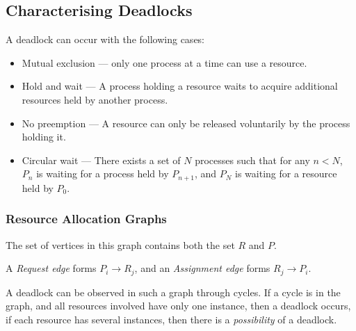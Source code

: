 \subsection{Characterising Deadlocks}

A deadlock can occur with the following cases:

\begin{itemize}
    \item Mutual exclusion --- only one process at a time can use a resource.
    \item Hold and wait --- A process holding a resource waits to acquire additional resources held by another process.
    \item No preemption --- A resource can only be released voluntarily by the process holding it.
    \item Circular wait --- There exists a set of $N$ processes such that for any $n<N$, $P_n$ is waiting for a process held by $P_{n+1}$, and $P_N$ is waiting for a resource held by $P_0$.
\end{itemize}


\subsubsection{Resource Allocation Graphs}

The set of vertices in this graph contains both the set $R$ and $P$.

A \textit{Request edge} forms $P_i\to R_j$, and an \textit{Assignment edge} forms $R_j\to P_i$.

A deadlock can be observed in such a graph through cycles. If a cycle is in the graph, and all resources involved have only one instance,
then a deadlock occurs, if each resource has several instances, then there is a \textit{possibility} of a deadlock.